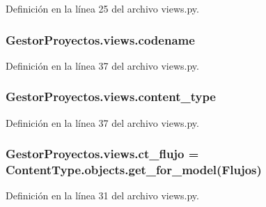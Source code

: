 Definición en la línea 25 del archivo views.\+py.

\subsubsection[{\texorpdfstring{codename}{codename}}]{\setlength{\rightskip}{0pt plus 5cm}Gestor\+Proyectos.\+views.\+codename}\hypertarget{namespace_gestor_proyectos_1_1views_aaa4ba901309d24b99e48452cb20e0e5a}{}\label{namespace_gestor_proyectos_1_1views_aaa4ba901309d24b99e48452cb20e0e5a}


Definición en la línea 37 del archivo views.\+py.

\subsubsection[{\texorpdfstring{content\+\_\+type}{content_type}}]{\setlength{\rightskip}{0pt plus 5cm}Gestor\+Proyectos.\+views.\+content\+\_\+type}\hypertarget{namespace_gestor_proyectos_1_1views_ab28048a155616cb67bf07a6882e8d717}{}\label{namespace_gestor_proyectos_1_1views_ab28048a155616cb67bf07a6882e8d717}


Definición en la línea 37 del archivo views.\+py.

\subsubsection[{\texorpdfstring{ct\+\_\+flujo}{ct_flujo}}]{\setlength{\rightskip}{0pt plus 5cm}Gestor\+Proyectos.\+views.\+ct\+\_\+flujo = Content\+Type.\+objects.\+get\+\_\+for\+\_\+model({\bf Flujos})}\hypertarget{namespace_gestor_proyectos_1_1views_af402baef688536526634ecdcc143a478}{}\label{namespace_gestor_proyectos_1_1views_af402baef688536526634ecdcc143a478}


Definición en la línea 31 del archivo views.\+py.

